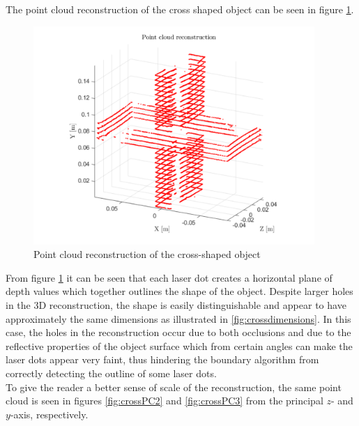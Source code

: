 The point cloud reconstruction of the cross shaped object can be seen in figure \ref{fig:crossPC1}.
\begin{figure}[H]
    \centering
    \includegraphics[width=0.95\textwidth]{figures/reconstruction/crossPC1.pdf}
    \caption{Point cloud reconstruction of the cross-shaped object}
    \label{fig:crossPC1}
\end{figure}

From figure \ref{fig:crossPC1} it can be seen that each laser dot creates a horizontal plane of depth values which together outlines the shape of the object. Despite larger holes in the 3D reconstruction, the shape is easily distinguishable and appear to have approximately the same dimensions as illustrated in \ref{fig:crossdimensions}. In this case, the holes in the reconstruction occur due to both occlusions and due to the reflective properties of the object surface which from certain angles can make the laser dots appear very faint, thus hindering the boundary algorithm from correctly detecting the outline of some laser dots.\\

To give the reader a better sense of scale of the reconstruction, the same point cloud is seen in figures \ref{fig:crossPC2} and \ref{fig:crossPC3} from the principal $z$- and $y$-axis, respectively.

